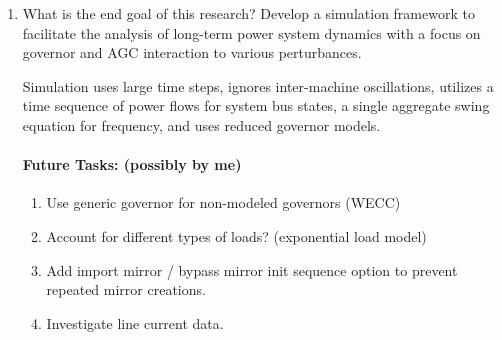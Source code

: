 \documentclass[12pt]{article}
\begin{document}
\begin{multicols}{2}
\begin{enumerate}
	
	\item What is the end goal of this research?
	\subitem Develop a simulation framework to facilitate the analysis of long-term power system dynamics	with a focus on governor and AGC interaction to various perturbances.
	
	 Simulation uses large time steps, ignores inter-machine oscillations, utilizes a time sequence of power flows for system bus states, a single aggregate swing equation for frequency, and uses reduced governor models.
	

\vfill\null
\columnbreak

\paragraph{Future Tasks: (possibly by me)} %
	\begin{enumerate}

		\item Use generic governor for non-modeled governors (WECC)

		\item Account for different types of loads? (exponential load model) %
		
		\item Add import mirror / bypass mirror init sequence option to prevent repeated mirror creations.

		\item Investigate line current data.
		
	\end{enumerate}

\end{enumerate}
\end{multicols}
\end{document}
